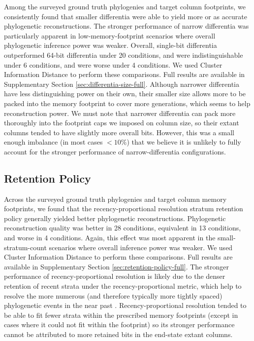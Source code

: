 Among the surveyed ground truth phylogenies and target column footprints, we consistently found that smaller differentia were able to yield more or as accurate phylogenetic reconstructions.
The stronger performance of narrow differentia was particularly apparent in low-memory-footprint scenarios where overall phylogenetic inference power was weaker.
Overall, single-bit differentia outperformed 64-bit differentia under 20 conditions, and were indistinguishable under 6 conditions, and were worse under 4 conditions.
We used Cluster Information Distance to perform these comparisons.
Full results are available in Supplementary Section \ref{sec:differentia-size-full}.
Although narrower differentia have less distinguishing power on their own, their smaller size allows more to be packed into the memory footprint to cover more generations, which seems to help reconstruction power.
We must note that narrower differentia can pack more thoroughly into the footprint caps we imposed on column size, so their extant columns tended to have slightly more overall bits.
However, this was a small enough imbalance (in most cases $<10\%$) that we believe it is unlikely to fully account for the stronger performance of narrow-differentia configurations.

\subsection{Retention Policy}

Across the surveyed ground truth phylogenies and target column memory footprints, we found that the recency-proportional resolution stratum retention policy generally yielded better phylogenetic reconstructions.
Phylogenetic reconstruction quality was better in 28 conditions, equivalent in 13 conditions, and worse in 4 conditions.
Again, this effect was most apparent in the small-stratum-count scenarios where overall inference power was weaker.
We used Cluster Information Distance to perform these comparisons.
Full results are available in Supplementary Section \ref{sec:retention-policy-full}.
The stronger performance of recency-proportional resolution is likely due to the denser retention of recent strata under the recency-proportional metric, which help to resolve the more numerous (and therefore typically more tightly spaced) phylogenetic events in the near past \citep{zhaxybayeva2004cladogenesis}.
Recency-proportional resolution tended to be able to fit fewer strata within the prescribed memory footprints (except in cases where it could not fit within the footprint) so its stronger performance cannot be attributed to more retained bits in the end-state extant columns.
